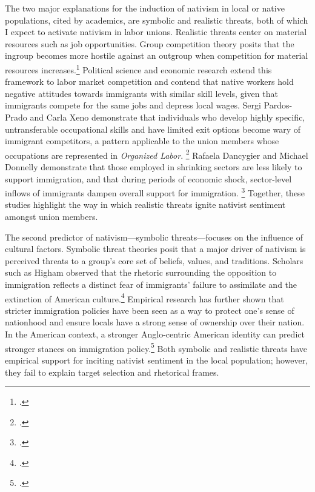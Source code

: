 \documentclass[12pt,a4paper]{article}
\begin{document}
The two major explanations for the induction of nativism in local or native populations, cited by academics, are symbolic and realistic threats, both of which I expect to activate nativism in labor unions. Realistic threats center on material resources such as job opportunities. Group competition theory posits that the ingroup becomes more hostile against an outgroup when competition for material resources increases.\footcites{olzak_competition_2013}{ersanilli_fixed-term_2023} Political science and economic research extend this framework to labor market competition and contend that native workers hold negative attitudes towards immigrants with similar skill levels, given that immigrants compete for the same jobs and depress local wages. Sergi Pardos-Prado and Carla Xeno demonstrate that individuals who develop highly specific, untransferable occupational skills and have limited exit options become wary of immigrant competitors, a pattern applicable to the union members whose occupations are represented in \textit{Organized Labor}. \footcite{pardos-prado_skill_2019} Rafaela Dancygier and Michael Donnelly demonstrate that those employed in shrinking sectors are less likely to support immigration, and that during periods of economic shock, sector-level inflows of immigrants dampen overall support for immigration. \footcite{dancygier_sectoral_2013} Together, these studies highlight the way in which realistic threats ignite nativist sentiment amongst union members.

The second predictor of nativism---symbolic threats---focuses on the influence of cultural factors. Symbolic threat theories posit that a major driver of nativism is perceived threats to a group's core set of beliefs, values, and traditions. Scholars such as Higham observed that the rhetoric surrounding the opposition to immigration reflects a distinct fear of immigrants' failure to assimilate and the extinction of American culture.\footcite{higham_strangers_1955} Empirical research has further shown that stricter immigration policies have been seen as a way to protect one's sense of nationhood and ensure locals have a strong sense of ownership over their nation. In the American context, a stronger Anglo-centric American identity can predict stronger stances on immigration policy.\footcites{mukherjee_reasonable_2013}{mukherjee_support_2018} Both symbolic and realistic threats have empirical support for inciting nativist sentiment in the local population; however, they fail to explain target selection and rhetorical frames.
\end{document}
